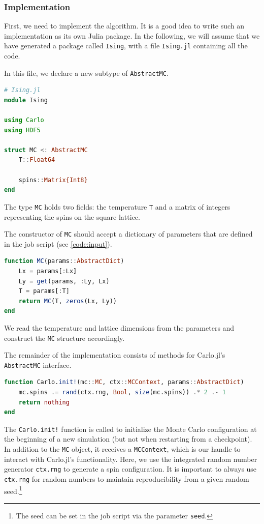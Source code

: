 \documentclass{SciPost}
\begin{document}
\subsubsection{Implementation}
First, we need to implement the algorithm. It is a good idea to write such an implementation as its own Julia package. In the following, we will assume that we have generated a package called \texttt{Ising}, with a file \texttt{Ising.jl} containing all the code.

In this file, we declare a new subtype of \texttt{AbstractMC}.
\begin{lstlisting}[language=julia]
# Ising.jl
module Ising

using Carlo
using HDF5

struct MC <: AbstractMC
    T::Float64

    spins::Matrix{Int8}
end
\end{lstlisting}
The type \texttt{MC} holds two fields: the temperature \texttt{T} and a matrix of integers representing the spins on the square lattice.

The constructor of \texttt{MC} should accept a dictionary of parameters that are defined in the job script (see \cref{code:input}).
\begin{lstlisting}[language=julia]
function MC(params::AbstractDict)
    Lx = params[:Lx]
    Ly = get(params, :Ly, Lx)
    T = params[:T]
    return MC(T, zeros(Lx, Ly))
end
\end{lstlisting}
We read the temperature and lattice dimensions from the parameters and construct the \texttt{MC} structure accordingly.

The remainder of the implementation consists of methods for Carlo.jl's \texttt{AbstractMC} interface.

\begin{lstlisting}[language=julia]
function Carlo.init!(mc::MC, ctx::MCContext, params::AbstractDict)
    mc.spins .= rand(ctx.rng, Bool, size(mc.spins)) .* 2 .- 1
    return nothing
end
\end{lstlisting}
The \texttt{Carlo.init!} function is called to initialize the Monte Carlo configuration at the beginning of a new simulation (but not when restarting from a checkpoint). In addition to the \texttt{MC} object, it receives a \texttt{MCContext}, which is our handle to interact with Carlo.jl's functionality. Here, we use the integrated random number generator \texttt{ctx.rng} to generate a spin configuration. It is important to always use \texttt{ctx.rng} for random numbers to maintain reproducibility from a given random seed.\footnote{The seed can be set in the job script via the parameter \texttt{seed}.}
\end{document}
